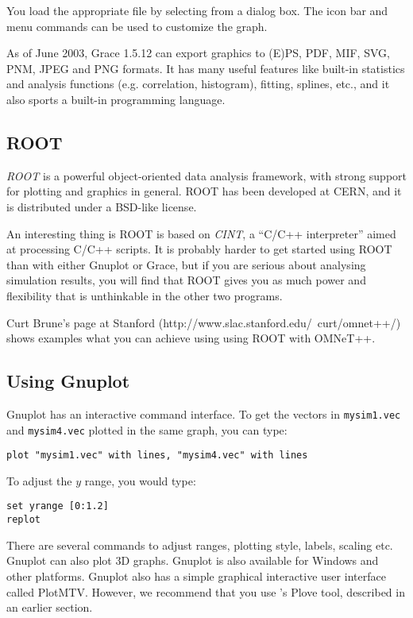 You load the appropriate file by selecting from a dialog box.
The icon bar and menu commands can be used to customize
the graph.

As of June 2003, Grace 1.5.12 can export graphics to (E)PS, PDF, MIF, SVG,
PNM, JPEG and PNG formats. It has many useful features like built-in statistics
and analysis functions (e.g. correlation, histogram), fitting, splines, etc.,
and it also sports a built-in programming language.


\subsection{ROOT}

\textit{ROOT} is a powerful object-oriented data analysis framework,
with strong support for plotting and graphics in general.
ROOT has been developed at CERN, and it is distributed under a BSD-like license.

An interesting thing is ROOT is based on \textit{CINT}, a ``C/C++ interpreter''
aimed at processing C/C++ scripts. It is probably harder to get started
using ROOT than with either Gnuplot or Grace, but if you are serious
about analysing simulation results, you will find that ROOT gives you
as much power and flexibility that is unthinkable in the other two programs.

Curt Brune's page at Stanford (http://www.slac.stanford.edu/~curt/omnet++/)
shows examples what you can achieve using using ROOT with OMNeT++.


\subsection{Using Gnuplot}

Gnuplot has an interactive command interface. To get the vectors in
\texttt{mysim1.vec} and \texttt{mysim4.vec} plotted in the same graph,
you can type:

\begin{verbatim}
plot "mysim1.vec" with lines, "mysim4.vec" with lines
\end{verbatim}

To adjust the $y$ range, you would type:

\begin{verbatim}
set yrange [0:1.2]
replot
\end{verbatim}


There are several commands to adjust ranges, plotting style, labels,
scaling etc. Gnuplot can also plot 3D graphs. Gnuplot
is also available for Windows and other platforms. Gnuplot also
has a simple graphical interactive user interface called PlotMTV.
However, we recommend that you use {\opp}'s Plove tool, described in
an earlier section.




